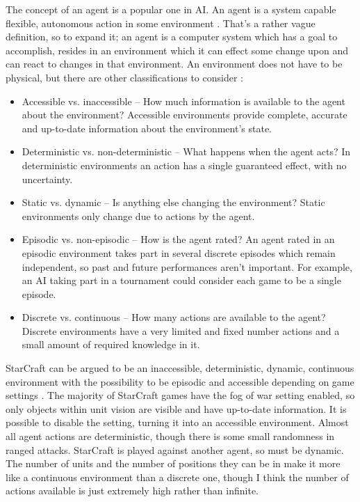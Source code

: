 \documentclass[11pt,openright,a4paper]{report}
\begin{document}
The concept of an agent is a popular one in AI. An agent is a system capable flexible, autonomous action in some environment \cite{wooldridge1995intelligent}. That's a rather vague definition, so to expand it; an agent is a computer system which has a goal to accomplish, resides in an environment which it can effect some change upon and can react to changes in that environment. An environment does not have to be physical, but there are other classifications to consider \cite{russell1995artificial}:
\begin{itemize}
\item{Accessible vs. inaccessible – How much information is available to the agent about the environment? Accessible environments provide complete, accurate and up-to-date information about the environment's state. }
\item{Deterministic vs. non-deterministic – What happens when the agent acts? In deterministic environments an action has a single guaranteed effect, with no uncertainty. }
\item{Static vs. dynamic – Is anything else changing the environment? Static environments only change due to actions by the agent.}
\item{Episodic vs. non-episodic – How is the agent rated? An agent rated in an episodic environment takes part in several discrete episodes which remain independent, so past and future performances aren't important.  For example, an AI taking part in a tournament could consider each game to be a single episode.}
\item{Discrete vs. continuous – How many actions are available to the agent? Discrete environments have a very limited and fixed number actions and a small amount of required knowledge in it.}
\end{itemize}
StarCraft can be argued to be an inaccessible, deterministic, dynamic, continuous environment with the possibility to be episodic and accessible depending on game settings \cite{davies2012}. The majority of StarCraft games have the fog of war setting enabled, so only objects within unit vision are visible and have up-to-date information. It is possible to disable the setting, turning it into an accessible environment. Almost all agent actions are deterministic, though there is some small randomness in ranged attacks. StarCraft is played against another agent, so must be dynamic. The number of units and the number of positions they can be in make it more like a continuous environment than a discrete one, though I think the number of actions available is just extremely high rather than infinite.
\end{document}
